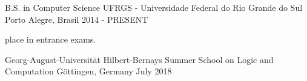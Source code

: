 \begin{cventries}
  \cventry
    {B.S. in Computer Science}
    {UFRGS - Universidade Federal do Rio Grande do Sul}
    {Porto Alegre, Brasil}
    {2014 - PRESENT}
    {
      \begin{cvitems}
        \item { place in entrance exams.}
      \end{cvitems}
    }
\end{cventries}


\begin{cventries}
  \cvcompactentry
    {Georg-August-Universität}
    {Hilbert-Bernays Summer School on Logic and Computation}
    {Göttingen, Germany}
    {July 2018}
\end{cventries}
